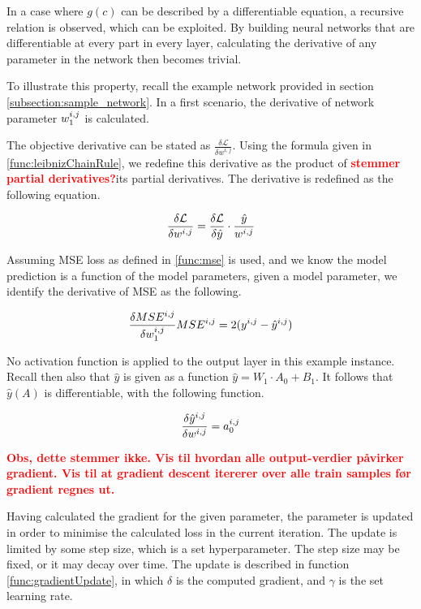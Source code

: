 In a case where $ g(c) $ can be described by a differentiable equation, a recursive relation is observed, which can be exploited. 
By building neural networks that are differentiable at every part in every layer, calculating the derivative of any parameter in the network then becomes trivial.

To illustrate this property, recall the example network provided in section \ref{subsection:sample_network}. 
In a first scenario, the derivative of network parameter $ w_1^{i,\space j} $ is calculated.

The objective derivative can be stated as $ \frac{\delta \mathcal{L}}{\delta w^{i, j}} $.
Using the formula given in \ref{func:leibnizChainRule}, we redefine this derivative as the product of \textcolor{red}{\textbf{stemmer partial derivatives?}}its partial derivatives.
The derivative is redefined as the following equation.


$$ \frac{\delta \mathcal{L}}{\delta w^{i, \space j}} = \frac{\delta \mathcal{L}}{\delta \hat{y}} \cdot \frac{\hat{y}}{w^{i, \space j}} $$


Assuming MSE loss as defined in \ref{func:mse} is used, and we know the model prediction is a function of the model parameters, 
given a model parameter, we identify the derivative of MSE as the following.


\[
    \frac{\delta MSE^{i, j}}{\delta w_1^{i, \space j}} MSE^{i, j} = 2(y^{i, j} - \hat{y}^{i, j})
\]


No activation function is applied to the output layer in this example instance. Recall then also that $ \hat{y} $ is given as a function $ \hat{y} = W_1 \cdot A_0 + B_1 $. 
It follows that $ \hat{y}(A) $ is differentiable, with the following function.

\[
    \frac{\delta \hat{y}^{i, j}}{\delta w^{i,\space j}} = a_0^{i, \space j}
\]

\textcolor{red}{\textbf{Obs, dette stemmer ikke. Vis til hvordan alle output-verdier påvirker gradient. Vis til at gradient descent itererer over alle train samples før gradient regnes ut.}}


Having calculated the gradient for the given parameter, the parameter is updated in order to minimise the calculated loss in the current iteration. 
The update is limited by some step size, which is a set hyperparameter. The step size may be fixed, or it may decay over time.
The update is described in function \ref{func:gradientUpdate}, in which $ \delta $ is the computed gradient, and $ \gamma $ is the set learning rate.



